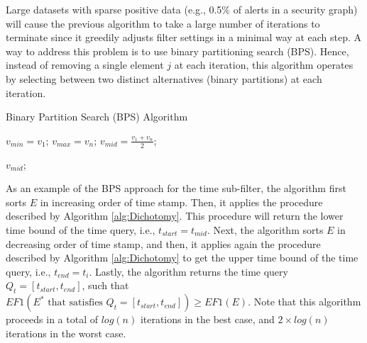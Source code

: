  Large datasets with sparse positive data (e.g., 0.5\% of alerts in a security graph) will cause the previous algorithm to take a large number of iterations to terminate since it greedily adjusts filter settings in a minimal way at each step.  A way to address this problem is to use binary partitioning search (BPS).  Hence, instead of removing a single element $j$ at each iteration, this algorithm operates by selecting between two distinct alternatives (binary partitions) at each iteration. 

\begin{algorithm}[t]
\caption{Binary Partition Search (BPS) Algorithm}
\SetAlgoLined
{}
\BlankLine
\label{alg:Dichotomy}

$v_{min}=v_1$; $v_{max}=v_n$;  $v_{mid}=\tfrac{v_1+v_n}{2}$;

\Return  $v_{mid}$;

\label{alg:return}
\end{algorithm} 



As an example of the BPS approach for the time sub-filter, the algorithm first sorts $E$ in increasing order of time stamp. Then, it applies the procedure described by Algorithm \ref{alg:Dichotomy}. This procedure will return  the lower time bound of the time query, i.e., $t_{start}=t_{mid}$.
Next, the algorithm sorts $E$ in decreasing order of time stamp, and then, it applies again the procedure described by Algorithm \ref{alg:Dichotomy} to get the upper time bound of the time query, i.e., $t_{end}=t_i$. Lastly, the algorithm returns the  time query $Q_t=[t_{start},t_{end}]$, such that $EF1(E^{*} \textrm{ that satisfies } Q_t=[t_{start},t_{end}]) \geq EF1(E)$. Note that this algorithm proceeds in a total of $log(n)$ iterations in the best case, and $2\times log(n)$ iterations in the worst case.

